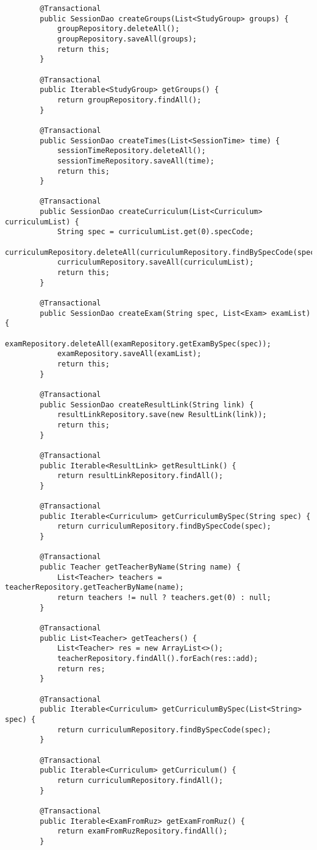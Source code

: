 \begin{lstlisting}
		@Transactional
		public SessionDao createGroups(List<StudyGroup> groups) {
			groupRepository.deleteAll();
			groupRepository.saveAll(groups);
			return this;
		}
		
		@Transactional
		public Iterable<StudyGroup> getGroups() {
			return groupRepository.findAll();
		}
		
		@Transactional
		public SessionDao createTimes(List<SessionTime> time) {
			sessionTimeRepository.deleteAll();
			sessionTimeRepository.saveAll(time);
			return this;
		}
		
		@Transactional
		public SessionDao createCurriculum(List<Curriculum> curriculumList) {
			String spec = curriculumList.get(0).specCode;
			curriculumRepository.deleteAll(curriculumRepository.findBySpecCode(spec));
			curriculumRepository.saveAll(curriculumList);
			return this;
		}
		
		@Transactional
		public SessionDao createExam(String spec, List<Exam> examList) {
			examRepository.deleteAll(examRepository.getExamBySpec(spec));
			examRepository.saveAll(examList);
			return this;
		}
		
		@Transactional
		public SessionDao createResultLink(String link) {
			resultLinkRepository.save(new ResultLink(link));
			return this;
		}
		
		@Transactional
		public Iterable<ResultLink> getResultLink() {
			return resultLinkRepository.findAll();
		}
		
		@Transactional
		public Iterable<Curriculum> getCurriculumBySpec(String spec) {
			return curriculumRepository.findBySpecCode(spec);
		}
		
		@Transactional
		public Teacher getTeacherByName(String name) {
			List<Teacher> teachers = teacherRepository.getTeacherByName(name);
			return teachers != null ? teachers.get(0) : null;
		}
		
		@Transactional
		public List<Teacher> getTeachers() {
			List<Teacher> res = new ArrayList<>();
			teacherRepository.findAll().forEach(res::add);
			return res;
		}
		
		@Transactional
		public Iterable<Curriculum> getCurriculumBySpec(List<String> spec) {
			return curriculumRepository.findBySpecCode(spec);
		}
		
		@Transactional
		public Iterable<Curriculum> getCurriculum() {
			return curriculumRepository.findAll();
		}
		
		@Transactional
		public Iterable<ExamFromRuz> getExamFromRuz() {
			return examFromRuzRepository.findAll();
		}
		

\end{lstlisting}
